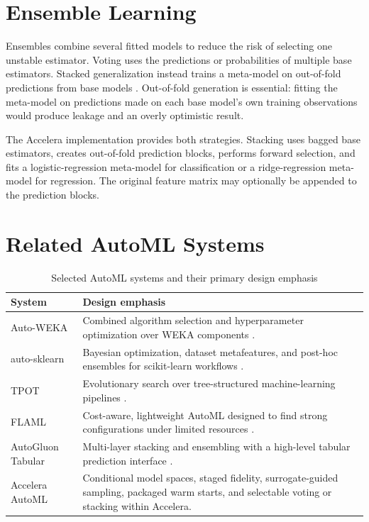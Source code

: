 \documentclass[12pt,a4paper,oneside]{report}
\newcommand{\systemname}{Accelera AutoML}
\begin{document}
\section{Ensemble Learning}

Ensembles combine several fitted models to reduce the risk of selecting one
unstable estimator. Voting uses the predictions or probabilities of multiple
base estimators. Stacked generalization instead trains a meta-model on
out-of-fold predictions from base models \cite{stacking}. Out-of-fold
generation is essential: fitting the meta-model on predictions made on each
base model's own training observations would produce leakage and an overly
optimistic result.

\medskip

\noindent The Accelera implementation provides both strategies. Stacking uses bagged
base estimators, creates out-of-fold prediction blocks, performs forward
selection, and fits a logistic-regression meta-model for classification or a
ridge-regression meta-model for regression. The original feature matrix may
optionally be appended to the prediction blocks.

\section{Related AutoML Systems}

\begin{table}[H]
\centering
\caption{Selected AutoML systems and their primary design emphasis}
\label{tab:related-systems}

\renewcommand{\arraystretch}{1.15}
\begin{tabularx}{\textwidth}
{>{\raggedright\arraybackslash}p{}X}
\toprule
\textbf{System} & \textbf{Design emphasis} \\
\midrule

Auto-WEKA &
Combined algorithm selection and hyperparameter optimization over WEKA
components \cite{autoweka}. \\

auto-sklearn &
Bayesian optimization, dataset metafeatures, and post-hoc ensembles for
scikit-learn workflows \cite{autosklearn}. \\

TPOT &
Evolutionary search over tree-structured machine-learning pipelines
\cite{tpot}. \\

FLAML &
Cost-aware, lightweight AutoML designed to find strong configurations under
limited resources \cite{flaml}. \\

AutoGluon Tabular &
Multi-layer stacking and ensembling with a high-level tabular prediction
interface \cite{autogluon}. \\

\systemname{} &
Conditional model spaces, staged fidelity, surrogate-guided sampling,
packaged warm starts, and selectable voting or stacking within Accelera. \\

\bottomrule
\end{tabularx}
\end{table}
\end{document}
